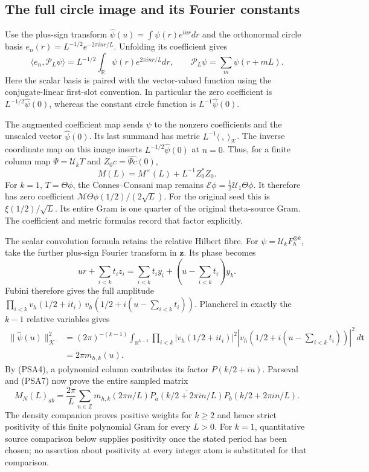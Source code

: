 \documentclass{article}
\begin{document}
\subsection{The full circle image and its Fourier constants}

Use the plus-sign transform
$\widehat\psi(u)=\int\psi(r)e^{iur}dr$ and the orthonormal circle
basis $e_n(r)=L^{-1/2}e^{-2\pi inr/L}$. Unfolding its coefficient gives
\[
 \langle e_n,\mathcal P_L\psi\rangle
 =L^{-1/2}\int_{\mathbb R}\psi(r)e^{2\pi inr/L}dr,
 \qquad \mathcal P_L\psi=\sum_m\psi(r+mL).
 \tag{PSA7}
\]
Here the scalar basis is paired with the vector-valued function using
the conjugate-linear first-slot convention. In particular the zero
coefficient is $L^{-1/2}\widehat\psi(0)$, whereas the constant circle
function is $L^{-1}\widehat\psi(0)$.

The augmented coefficient map sends $\psi$ to the nonzero coefficients
and the unscaled vector $\widehat\psi(0)$. Its last summand has metric
$L^{-1}\langle\ ,\ \rangle_{\mathcal K}$. The inverse coordinate map
on this image inserts $L^{-1/2}\widehat\psi(0)$ at $n=0$. Thus, for a
finite column map $\Psi=\mathcal U_kT$ and $Z_0c=\widehat{\Psi c}(0)$,
\[
 M(L)=M^\times(L)+L^{-1}Z_0^*Z_0.
 \tag{PSA8}
\]
For $k=1$, $T=\Theta\phi$, the Connes--Consani map remains
$\mathcal E\phi=\tfrac12\mathcal U_1\Theta\phi$. It therefore has
zero coefficient $\mathcal M\Theta\phi(1/2)/(2\sqrt L)$. For the
original seed this is $\xi(1/2)/\sqrt L$. Its entire Gram is one quarter
of the original theta-source Gram. The coefficient and metric formulas
record that factor explicitly.

The scalar convolution formula retains the relative Hilbert fibre.
For $\psi=\mathcal U_kF_h^{\otimes k}$, take the further plus-sign
Fourier transform in $\mathbf z$. Its phase becomes
\[
 ur+\sum_{i<k}t_i z_i
 =\sum_{i<k}t_i y_i+
       \left(u-\sum_{i<k}t_i\right)y_k.
 \tag{PSA9}
\]
Fubini therefore gives the full amplitude
$\prod_{i<k}v_h(1/2+it_i)\,
 v_h(1/2+i(u-\sum_{i<k}t_i))$.
Plancherel in exactly the $k-1$ relative variables gives
\[
 \begin{split}
 \|\widehat\psi(u)\|_{\mathcal K}^2
 &=(2\pi)^{-(k-1)}\int_{\mathbb R^{k-1}}
   \prod_{i<k}|v_h(1/2+it_i)|^2
   |v_h(1/2+i(u-\sum_{i<k}t_i))|^2\,d\mathbf t\\
 &=2\pi m_{h,k}(u).
 \end{split}
 \tag{PSA10}
\]
By (PSA4), a polynomial column contributes its factor
$P(k/2+iu)$. Parseval and (PSA7) now prove the entire sampled matrix
\[
 M_N(L)_{ab}=\frac{2\pi}{L}\sum_{n\in\mathbb Z}
 m_{h,k}(2\pi n/L)
 \overline{P_a(k/2+2\pi in/L)}P_b(k/2+2\pi in/L).
 \tag{PSA11}
\]
The density companion proves positive weights for $k\ge2$ and hence
strict positivity of this finite polynomial Gram for every $L>0$.
For $k=1$, quantitative source comparison below supplies positivity
once the stated period has been chosen; no assertion about positivity
at every integer atom is substituted for that comparison.
\end{document}
